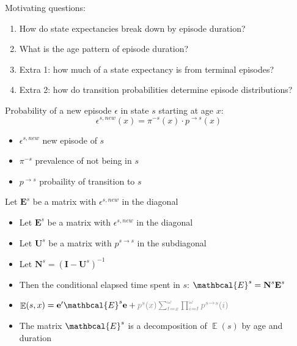 \documentclass[20pt,usenames,dvipsnames]{beamer}
\DeclareMathOperator{\EX}{\mathbb{E}}%
\begin{document}
\begin{frame}[plain]
\Large
\centering
 Motivating questions:\vspace{2em}
 \begin{enumerate}[<+->]
 \item How do state expectancies break down by episode duration?
 \item What is the age pattern of episode duration?
 \item Extra 1: how much of a state expectancy is from terminal episodes?
 \item Extra 2: how do transition probabilities determine episode distributions?
 \end{enumerate}
\end{frame}
\begin{frame}[plain]
\Large
\centering
 Probability of a new episode $\epsilon$ in state $s$ starting at age $x$:\vspace{2em}
 \begin{equation}
 \epsilon^{s,new}(x) = \pi^{-s}(x) \cdot p^{\rightarrow s}(x)
 \end{equation}
 \begin{itemize}
 \item $\epsilon^{s,new}$ new episode of $s$
 \item $\pi^{-s}$ prevalence of not being in $s$
 \item $p^{\rightarrow s}$ probaility of transition to $s$
 \end{itemize}
 
 Let $\textbf{E}^s$ be a matrix with $\epsilon^{s,new}$ in the diagonal
\end{frame}

\begin{frame}[plain]
\Large
\begin{itemize}[<+->]
\item Let $\textbf{E}^s$ be a matrix with $\epsilon^{s,new}$ in the diagonal
\item Let $\textbf{U}^s$ be a matrix with $p^{s\rightarrow s}$ in the subdiagonal
\item Let $\textbf{N}^s = \left( \textbf{I} - \textbf{U}^s \right)^{-1}$ 
\item Then the conditional elapsed time spent in $s$: $\mathbcal{E}^s = \textbf{N}^s \textbf{E}^s$
\item $\EX(s,x) = \textbf{e}' \mathbcal{E}^s \textbf{e} + \textcolor{mygray2}{p^s(x) \sum_{t=x}^\omega \prod_{i=t}^\omega p^{s\rightarrow s}(i)}$ 
\item The matrix $\mathbcal{E}^s$ is a decomposition of  $\EX(s)$ by age and duration
\end{itemize}

\end{frame}
\end{document}
